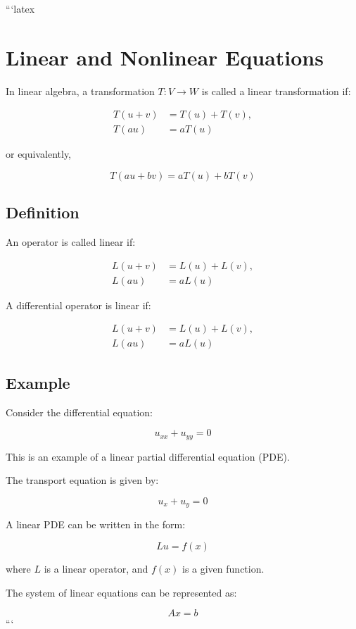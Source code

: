 ```latex
\section*{Linear and Nonlinear Equations}

In linear algebra, a transformation \( T: V \to W \) is called a linear transformation if:

\begin{align}
    T(u + v) &= T(u) + T(v), \\
    T(au) &= aT(u)
\end{align}

or equivalently,

\begin{equation}
    T(au + bv) = aT(u) + bT(v)
\end{equation}

\subsection*{Definition}

An operator is called linear if:

\begin{align}
    L(u + v) &= L(u) + L(v), \\
    L(au) &= aL(u)
\end{align}

A differential operator is linear if:

\begin{align}
    L(u + v) &= L(u) + L(v), \\
    L(au) &= aL(u)
\end{align}

\subsection*{Example}

Consider the differential equation:

\begin{equation}
    u_{xx} + u_{yy} = 0
\end{equation}

This is an example of a linear partial differential equation (PDE).

The transport equation is given by:

\begin{equation}
    u_x + u_y = 0
\end{equation}

A linear PDE can be written in the form:

\begin{equation}
    Lu = f(x)
\end{equation}

where \( L \) is a linear operator, and \( f(x) \) is a given function.

The system of linear equations can be represented as:

\begin{equation}
    Ax = b
\end{equation}
```
